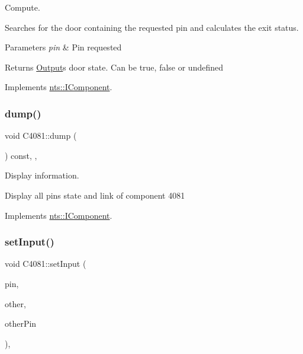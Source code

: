Compute. 

Searches for the door containing the requested pin and calculates the exit status.


\begin{DoxyParams}{Parameters}
{\em pin} & Pin requested \\
\hline
\end{DoxyParams}
\begin{DoxyReturn}{Returns}
\mbox{\hyperlink{classOutput}{Output}}\textquotesingle{}s door state. Can be true, false or undefined 
\end{DoxyReturn}


Implements \mbox{\hyperlink{classnts_1_1IComponent}{nts\+::\+I\+Component}}.

\mbox{\label{classC4081_a0ef9e2164c25c6aed2f2e3a54d7417fa}} 
\subsubsection{\texorpdfstring{dump()}{dump()}}
{\footnotesize\ttfamily void C4081\+::dump (\begin{DoxyParamCaption}{ }\end{DoxyParamCaption}) const\hspace{0.3cm}{\ttfamily [override]}, {\ttfamily [virtual]}, {\ttfamily [noexcept]}}



Display information. 

Display all pins state and link of component 4081 

Implements \mbox{\hyperlink{classnts_1_1IComponent}{nts\+::\+I\+Component}}.

\mbox{\label{classC4081_a21323fd9bab910718335dc009b2b90c2}} 
\subsubsection{\texorpdfstring{set\+Input()}{setInput()}}
{\footnotesize\ttfamily void C4081\+::set\+Input (\begin{DoxyParamCaption}\item[{std\+::size\+\_\+t}]{pin,  }\item[{\mbox{\hyperlink{classnts_1_1IComponent}{nts\+::\+I\+Component}} \&}]{other,  }\item[{std\+::size\+\_\+t}]{other\+Pin }\end{DoxyParamCaption})\hspace{0.3cm}{\ttfamily [final]}, {\ttfamily [virtual]}}



